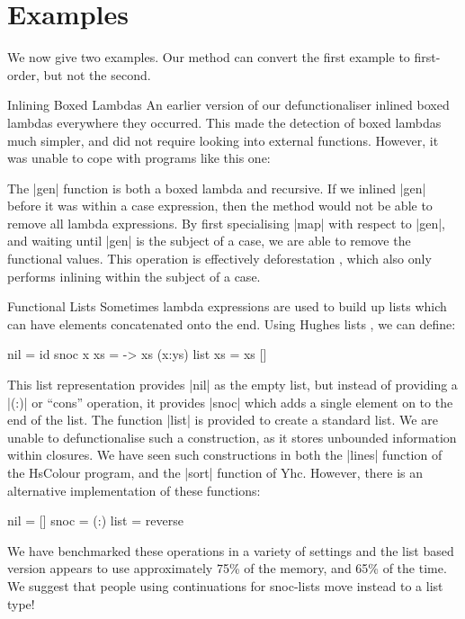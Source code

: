 \section{Examples}
\label{sec:examples}

We now give two examples. Our method can convert the first example to first-order, but not the second.

\begin{examplename}{Inlining Boxed Lambdas}
\label{ex:inlining_boxed_lambdas}
An earlier version of our defunctionaliser inlined boxed lambdas everywhere they occurred. This made the detection of boxed lambdas much simpler, and did not require looking into external functions. However, it was unable to cope with programs like this one:


The |gen| function is both a boxed lambda and recursive. If we inlined |gen| before it was within a case expression, then the method would not be able to remove all lambda expressions. By first specialising |map| with respect to |gen|, and waiting until |gen| is the subject of a case, we are able to remove the functional values. This operation is effectively deforestation \cite{wadler:deforestation}, which also only performs inlining within the subject of a case.
\end{examplename}

\begin{examplename}{Functional Lists}
\label{ex:functional_lists}
Sometimes lambda expressions are used to build up lists which can have elements concatenated onto the end. Using Hughes lists \cite{hughes:lists}, we can define:

\begin{code}
nil = id
snoc x xs = \ys -> xs (x:ys)
list xs = xs []
\end{code}

This list representation provides |nil| as the empty list, but instead of providing a |(:)| or ``cons'' operation, it provides |snoc| which adds a single element on to the end of the list. The function |list| is provided to create a standard list. We are unable to defunctionalise such a construction, as it stores unbounded information within closures. We have seen such constructions in both the |lines| function of the HsColour program, and the |sort| function of Yhc. However, there is an alternative implementation of these functions:

\begin{code}
nil = []
snoc = (:)
list = reverse
\end{code}

We have benchmarked these operations in a variety of settings and the list based version appears to use approximately 75\% of the memory, and 65\% of the time. We suggest that people using continuations for snoc-lists move instead to a list type!
\end{examplename}


